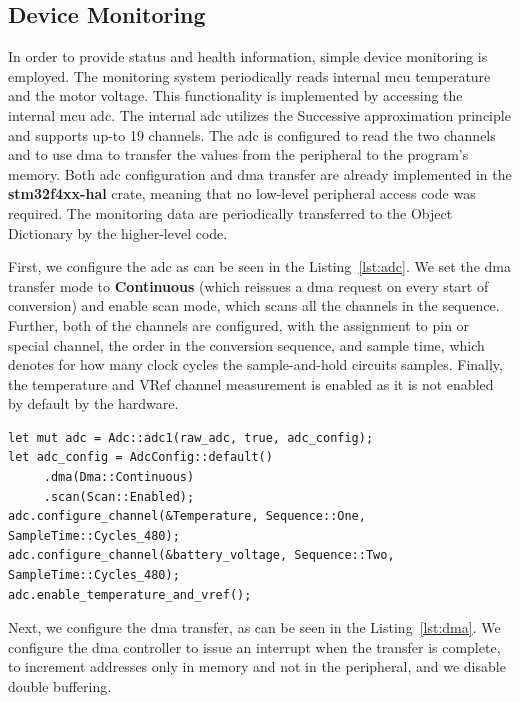 \subsection{Device Monitoring}
\label{subsec:device_monitoring}
In order to provide status and health information, simple device monitoring is employed.
The monitoring system periodically reads internal \acs{mcu} temperature and the motor voltage.
This functionality is implemented by accessing the internal \acs{mcu} \acs{adc}.
The internal \acs{adc} utilizes the Successive approximation principle and supports up-to 19 channels\cite{stmicro_stm32f405xx_2020}.
The \acs{adc} is configured to read the two channels and to use \acs{dma} to transfer the values from the peripheral to the program's memory.
Both \acs{adc} configuration and \acs{dma} transfer are already implemented in the \textbf{stm32f4xx-hal} crate, meaning that no low-level peripheral access code was required.
The monitoring data are periodically transferred to the Object Dictionary by the higher-level code.

First, we configure the \acs{adc} as can be seen in the Listing~\ref{lst:adc}.
We set the \acs{dma} transfer mode to \textbf{Continuous} (which reissues a \acs{dma} request on every start of conversion) and enable scan mode, which scans all the channels in the sequence.
Further, both of the channels are configured, with the assignment to pin or special channel, the order in the conversion sequence, and sample time, which denotes for how many clock cycles the sample-and-hold circuits samples.
Finally, the temperature and VRef channel measurement is enabled as it is not enabled by default by the hardware.

\newpage
\begin{lstlisting}[caption={Configuring ADC for temperature and voltage monitoring.},label=lst:adc]
let mut adc = Adc::adc1(raw_adc, true, adc_config);
let adc_config = AdcConfig::default()
     .dma(Dma::Continuous)
     .scan(Scan::Enabled);
adc.configure_channel(&Temperature, Sequence::One, SampleTime::Cycles_480);
adc.configure_channel(&battery_voltage, Sequence::Two, SampleTime::Cycles_480);
adc.enable_temperature_and_vref();
\end{lstlisting}

Next, we configure the \acs{dma} transfer, as can be seen in the Listing~\ref{lst:dma}.
We configure the \acs{dma} controller to issue an interrupt when the transfer is complete, to increment addresses only in memory and not in the peripheral, and we disable double buffering.

